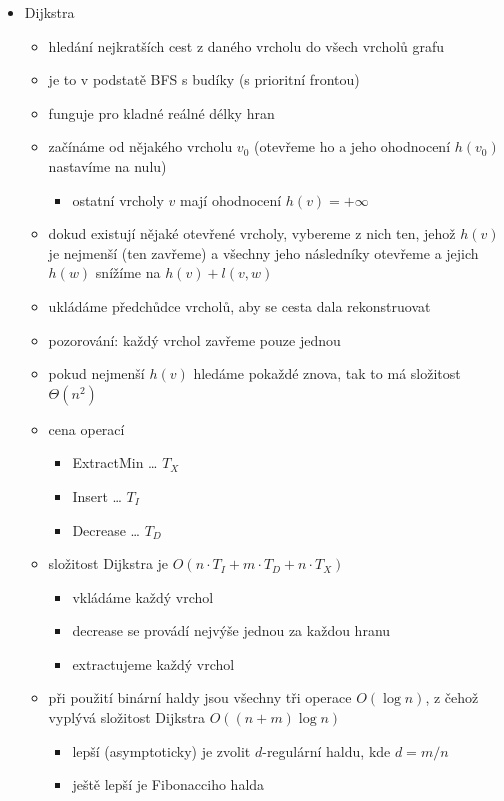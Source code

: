 \begin{itemize}
\begin{itemize}
\item Dijkstra
\begin{itemize}
\item hledání nejkratších cest z daného vrcholu do všech vrcholů grafu
\item je to v podstatě BFS s budíky (s prioritní frontou)
\item funguje pro kladné reálné délky hran
\item začínáme od nějakého vrcholu $v_0$ (otevřeme ho a jeho ohodnocení $h(v_0)$ nastavíme na nulu)
\begin{itemize}
\item ostatní vrcholy $v$ mají ohodnocení $h(v)=+\infty$
\end{itemize}
\item dokud existují nějaké otevřené vrcholy, vybereme z nich ten, jehož $h(v)$ je nejmenší (ten zavřeme) a všechny jeho následníky otevřeme a jejich $h(w)$ snížíme na $h(v)+l(v,w)$
\item ukládáme předchůdce vrcholů, aby se cesta dala rekonstruovat
\item pozorování: každý vrchol zavřeme pouze jednou
\item pokud nejmenší $h(v)$ hledáme pokaždé znova, tak to má složitost $\Theta(n^2)$
\item cena operací
\begin{itemize}
\item ExtractMin \dots{} $T_X$
\item Insert \dots{} $T_I$
\item Decrease \dots{} $T_D$
\end{itemize}
\item složitost Dijkstra je $O(n\cdot T_I+m\cdot T_D + n\cdot T_X)$
\begin{itemize}
\item vkládáme každý vrchol
\item decrease se provádí nejvýše jednou za každou hranu
\item extractujeme každý vrchol
\end{itemize}
\item při použití binární haldy jsou všechny tři operace $O(\log n)$, z čehož vyplývá složitost Dijkstra $O((n+m)\log n)$
\begin{itemize}
\item lepší (asymptoticky) je zvolit $d$-regulární haldu, kde $d=m/n$
\item ještě lepší je Fibonacciho halda
\end{itemize}

\end{itemize}
\end{itemize}
\end{itemize}
